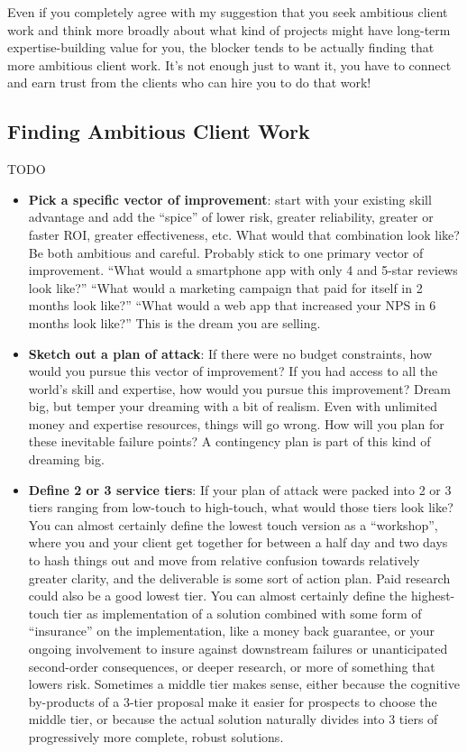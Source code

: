Even if you completely agree with my suggestion that you seek ambitious client work and think more broadly about what kind of projects might have long-term expertise-building value for you, the blocker tends to be actually finding that more ambitious client work. It's not enough just to want it, you have to connect and earn trust from the clients who can hire you to do that work!

\subsection{Finding Ambitious Client Work}

TODO

\begin{itemize}
\item \textbf{Pick a specific vector of improvement}: start with your existing skill advantage and add the ``spice'' of lower risk, greater reliability, greater or faster ROI, greater effectiveness, etc. What would that combination look like? Be both ambitious and careful. Probably stick to one primary vector of improvement. ``What would a smartphone app with only 4 and 5-star reviews look like?'' ``What would a marketing campaign that paid for itself in 2 months look like?'' ``What would a web app that increased your NPS in 6 months look like?'' This is the dream you are selling.
\item \textbf{Sketch out a plan of attack}: If there were no budget constraints, how would you pursue this vector of improvement? If you had access to all the world's skill and expertise, how would you pursue this improvement? Dream big, but temper your dreaming with a bit of realism. Even with unlimited money and expertise resources, things will go wrong. How will you plan for these inevitable failure points? A contingency plan is part of this kind of dreaming big.
\item \textbf{Define 2 or 3 service tiers}: If your plan of attack were packed into 2 or 3 tiers ranging from low-touch to high-touch, what would those tiers look like? You can almost certainly define the lowest touch version as a ``workshop'', where you and your client get together for between a half day and two days to hash things out and move from relative confusion towards relatively greater clarity, and the deliverable is some sort of action plan. Paid research could also be a good lowest tier. You can almost certainly define the highest-touch tier as implementation of a solution combined with some form of ``insurance'' on the implementation, like a money back guarantee, or your ongoing involvement to insure against downstream failures or unanticipated second-order consequences, or deeper research, or more of something that lowers risk. Sometimes a middle tier makes sense, either because the cognitive by-products of a 3-tier proposal make it easier for prospects to choose the middle tier, or because the actual solution naturally divides into 3 tiers of progressively more complete, robust solutions.

\end{itemize}
